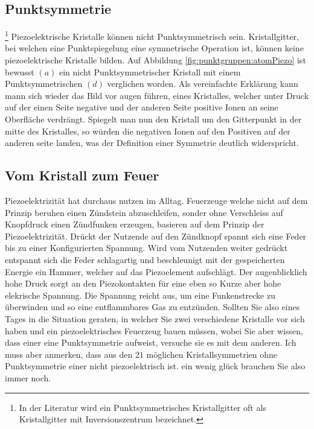 \subsection{Punktsymmetrie}\footnote{In der Literatur wird ein Punktsymmetrisches Kristallgitter oft als Kristallgitter mit Inversionszentrum bezeichnet.}
Piezoelektrische Kristalle können nicht Punktsymmetrisch sein.
Kristallgitter, bei welchen eine Punktspiegelung eine symmetrische Operation ist, können keine piezoelektrische Kristalle bilden.
Auf Abbildung \ref{fig:punktgruppen:atomPiezo} ist bewusst $(a)$ ein nicht Punktsymmetrischer Kristall mit einem Punktsymmetrischen $(d)$ verglichen worden.
Als vereinfachte Erklärung kann mann sich wieder das Bild vor augen führen, eines Kristalles, 
welcher unter Druck auf der einen Seite negative und der anderen Seite positive Ionen an seine Oberfläche verdrängt.
Spiegelt man nun den Kristall um den Gitterpunkt in der mitte des Kristalles, so würden die negativen Ionen auf den Positiven auf der anderen seite landen,
was der Definition einer Symmetrie deutlich widerspricht.

\subsection{Vom Kristall zum Feuer}
Piezoelektrizität hat durchaus nutzen im Alltag.
Feuerzeuge welche nicht auf dem Prinzip beruhen einen Zündstein abzuschleifen, 
sonder ohne Verschleiss auf Knopfdruck einen Zündfunken erzeugen, basieren auf dem Prinzip der Piezoelektrizität.
Drückt der Nutzende auf den Zündknopf spannt sich eine Feder bis zu einer Konfigurierten Spannung.
Wird vom Nutzenden weiter gedrückt entspannt sich die Feder schlagartig und beschleunigt mit der gespeicherten Energie ein Hammer,
welcher auf das Piezoelement aufschlägt.
Der augenblicklich hohe Druck sorgt an den Piezokontakten für eine eben so Kurze aber hohe elekrische Spannung.
Die Spannung reicht aus, um eine Funkenstrecke zu überwinden und so eine entflammbares Gas zu entzünden.
Sollten Sie also eines Tages in die Situation geraten, in welcher Sie zwei verschiedene Kristalle vor sich haben
und ein piezoelektrisches Feuerzeug bauen müssen,
wobei Sie aber wissen, dass einer eine Punktsymmetrie aufweist,
versuche sie es mit dem anderen.
Ich muss aber anmerken, dass aus den $21$ möglichen Kristallsymmetrien ohne Punktsymmetrie einer nicht piezoelektrisch ist.
ein wenig glück brauchen Sie also immer noch.
